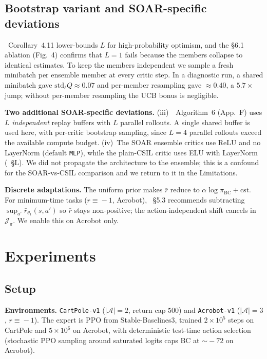 \documentclass[10pt]{article}
\newcommand{\Aspace}{\mathcal{A}}
\newcommand{\bcpol}{\pi_{\mathrm{BC}}}
\newcommand{\rb}{\bar{r}}
\begin{document}
\subsection{Bootstrap variant and SOAR-specific deviations}

\cite{viel2025ilsoar}~Corollary~4.11 lower-bounds $L$ for
high-probability optimism, and the \S6.1 ablation (Fig.~4) confirms
that $L\!=\!1$ fails because the members collapse to identical
estimates. To keep the members independent we sample a fresh
minibatch per ensemble member at every critic step. In a diagnostic
run, a shared minibatch gave $\mathrm{std}_\ell Q \approx 0.07$ and
per-member resampling gave $\approx 0.40$, a $5.7\times$ jump;
without per-member resampling the UCB bonus is negligible.

\textbf{Two additional SOAR-specific deviations.}
(iii)~\cite{viel2025ilsoar}~Algorithm~6 (App.~F) uses $L$
\emph{independent} replay buffers with $L$ parallel rollouts. A
single shared buffer is used here, with per-critic bootstrap sampling,
since $L\!=\!4$ parallel rollouts exceed the available compute budget.
(iv)~The SOAR ensemble critics use ReLU and no LayerNorm (default
\texttt{MLP}), while the plain-CSIL critic uses ELU with LayerNorm
(\cite{watson2023csil}~\S{}L). We did not propagate the architecture
to the ensemble; this is a confound for the SOAR-vs-CSIL comparison
and we return to it in the Limitations.

\textbf{Discrete adaptations.} The uniform prior makes $\rb$ reduce to
$\alpha\log\bcpol\!+\!\mathrm{cst}$. For minimum-time tasks
($r\!\equiv\!-1$, Acrobot), \cite{watson2023csil}~\S5.3 recommends
subtracting $\sup_{a'}\rb_{\theta_1}(s,a')$ so $\rb$ stays
non-positive; the action-independent shift cancels in
$\mathcal{J}_\pi$. We enable this on Acrobot only.

\section{Experiments}\label{sec:experiments}

\subsection{Setup}

\textbf{Environments.} \texttt{CartPole-v1} ($|\Aspace|\!=\!2$,
return cap $500$) and \texttt{Acrobot-v1} ($|\Aspace|\!=\!3$,
$r\!\equiv\!-1$). The expert is PPO from Stable-Baselines3,
trained $2\!\times\!10^5$ steps on CartPole and $5\!\times\!10^6$ on
Acrobot, with deterministic test-time action selection (stochastic PPO
sampling around saturated logits caps BC at $\sim\!-72$ on Acrobot).
\end{document}
